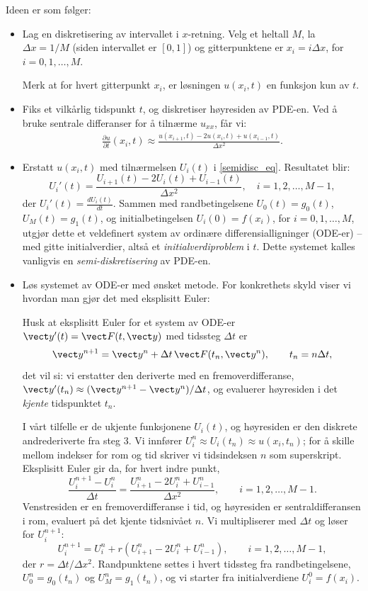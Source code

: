 Ideen er som følger:
\begin{itemize}
\item[\textbf{Steg 1:}] Lag en diskretisering av intervallet i \( x \)-retning. Velg et heltall \( M \), la \( \Delta x = 1/M \) (siden intervallet er \([0, 1]\)) og gitterpunktene er \( x_i = i \Delta x \), for \( i = 0, 1, \ldots, M \).

Merk at for hvert gitterpunkt \( x_i \), er løsningen \( u(x_i, t) \) en funksjon kun av \( t \).
\item[\textbf{Steg 2:}] Fiks et vilkårlig tidspunkt \( t \), og diskretiser høyresiden av PDE-en. Ved å bruke sentrale differanser for å tilnærme \( u_{xx} \), får vi:
\begin{align}\label{semidisc_eq}
\frac{\partial u}{\partial t}(x_i, t) \approx \frac{u(x_{i+1}, t) - 2u(x_i, t) + u(x_{i-1}, t)}{\Delta x^2}.
\end{align}
\item[\textbf{Steg 3:}] Erstatt \( u(x_i, t) \) med tilnærmelsen \( U_i(t) \) i \eqref{semidisc_eq}. Resultatet blir:
\[
U_i'(t) = \frac{U_{i+1}(t) - 2U_i(t) + U_{i-1}(t)}{\Delta x^2}, \quad i = 1, 2, \ldots, M-1,
\]
der \( U_i'(t) = \frac{dU_i(t)}{dt} \). Sammen med randbetingelsene \( U_0(t) = g_0(t) \), \( U_M(t) = g_1(t) \), og initialbetingelsen \( U_i(0) = f(x_i) \), for \( i = 0, 1, \ldots, M \), utgjør dette et veldefinert system av ordinære differensialligninger (ODE-er) -- med gitte initialverdier, altså et \emph{initialverdiproblem} i $t$.
Dette systemet kalles vanligvis en \textit{semi-diskretisering} av PDE-en.
\item[\textbf{Steg 4:}] Løs systemet av ODE-er med ønsket metode. For konkrethets skyld viser vi hvordan man gjør det med eksplisitt Euler:

Husk at eksplisitt Euler for et system av ODE-er $\vect y'(t)=\vect F(t,\vect y)$ med tidssteg $\Delta t$ er
\[
\vect y^{n+1} = \vect y^n + \Delta t\,\vect F(t_n,\vect y^n), \qquad t_n = n\Delta t,
\]
det vil si: vi erstatter den deriverte med en fremoverdifferanse, $\vect y'(t_n)\approx(\vect y^{n+1}-\vect y^n)/\Delta t$, og evaluerer høyresiden i det \emph{kjente} tidspunktet $t_n$.

I vårt tilfelle er de ukjente funksjonene $U_i(t)$, og høyresiden er den diskrete andrederiverte fra steg 3. Vi innfører $U_i^n\approx U_i(t_n)\approx u(x_i,t_n)$; for å skille mellom indekser for rom og tid skriver vi tidsindeksen $n$ som superskript. Eksplisitt Euler gir da, for hvert indre punkt,
\[
\frac{U_i^{n+1}-U_i^n}{\Delta t} = \frac{U_{i+1}^n-2U_i^n+U_{i-1}^n}{\Delta x^2}, \qquad i=1,2,\ldots,M-1.
\]
Venstresiden er en fremoverdifferanse i tid, og høyresiden er sentraldifferansen i rom, evaluert på det kjente tidsnivået $n$. Vi multipliserer med $\Delta t$ og løser for $U_i^{n+1}$:
\begin{equation}\label{eq:heat1d_explicit}
U_i^{n+1} = U_i^n + r \left( U_{i+1}^n - 2U_i^n + U_{i-1}^n \right), \qquad i = 1, 2, \ldots, M-1,
\end{equation}
der $r = \Delta t/\Delta x^2$. Randpunktene settes i hvert tidssteg fra randbetingelsene, $U_0^n=g_0(t_n)$ og $U_M^n=g_1(t_n)$, og vi starter fra initialverdiene $U_i^0=f(x_i)$.


\end{itemize}
